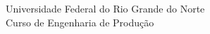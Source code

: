 \renewcommand{\imprimircapa}{%
  \begin{capa}%
    \center
    {\ABNTEXchapterfont\Large Universidade Federal do Rio Grande do Norte}
    \vspace*{0.5cm}\\
    {\ABNTEXchapterfont\Large Curso de Engenharia de Produção}
    \vspace*{0.5cm}\\
    {\ABNTEXchapterfont\large\imprimirautor}

    \vfill
    \begin{center}
    \ABNTEXchapterfont\bfseries\LARGE\imprimirtitulo
    \end{center}
    \vfill
    
    \large\imprimirlocal

    \large\imprimirdata
    
    \vspace*{1cm}
  \end{capa}
}

\imprimircapa